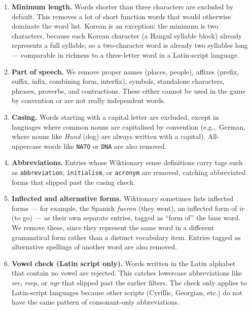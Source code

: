 \begin{enumerate}
    \item \textbf{Minimum length.} Words shorter than three characters are excluded by default.
    This removes a lot of short function words that would otherwise dominate the word list.
    Korean is an exception: the minimum is two characters, because each Korean character (a Hangul syllable block) already represents a full syllable, so a two-character word is already two syllables long — comparable in richness to a three-letter word in a Latin-script language.

    \item \textbf{Part of speech.} We remove proper names (places, people), affixes (prefix, suffix, infix, combining form, interfix), symbols, standalone characters, phrases, proverbs, and contractions.
    These either cannot be used in the game by convention or are not really independent words.

    \item \textbf{Casing.} Words starting with a capital letter are excluded, except in languages where common nouns are capitalised by convention (e.g.,\ German, where nouns like \textit{Hund} (dog) are always written with a capital).
    All-uppercase words like \texttt{NATO} or \texttt{DNA} are also removed.

    \item \textbf{Abbreviations.} Entries whose Wiktionary sense definitions carry tags such as \texttt{abbreviation}, \texttt{initialism}, or \texttt{acronym} are removed, catching abbreviated forms that slipped past the casing check.

    \item \textbf{Inflected and alternative forms.} Wiktionary sometimes lists inflected forms — for example, the Spanish \textit{fueron} (they went), an inflected form of \textit{ir} (to go) — as their own separate entries, tagged as ``form of'' the base word.
    We remove these, since they represent the same word in a different grammatical form rather than a distinct vocabulary item.
    Entries tagged as alternative spellings of another word are also removed.

    \item \textbf{Vowel check (Latin script only).} Words written in the Latin alphabet that contain no vowel are rejected.
    This catches lowercase abbreviations like \textit{src}, \textit{rsvp}, or \textit{ngr} that slipped past the earlier filters.
    The check only applies to Latin-script languages because other scripts (Cyrillic, Georgian, etc.) do not have the same pattern of consonant-only abbreviations.


\end{enumerate}
